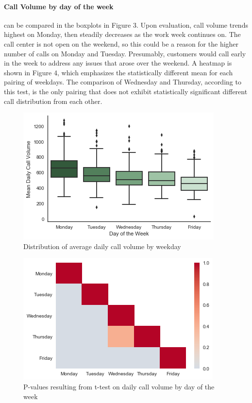 \documentclass[12pt]{article}
\begin{document}
\paragraph{Call Volume by day of the week} can be compared in the boxplots in Figure 3.  Upon evaluation, call volume trends highest on Monday, then steadily decreases as the work week continues on.  The call center is not open on the weekend, so this could be a reason for the higher number of calls on Monday and Tuesday. Presumably, customers would call early in the week to address any issues that arose over the weekend.  A heatmap is shown in Figure 4, which emphasizes the statistically different mean for each pairing of weekdays.  The comparison of Wednesday and Thursday, according to this test, is the only pairing that does not exhibit statistically significant different call distribution from each other.

	\begin{figure}
	\includegraphics[scale=.4]{Daily_Call_Boxplot.png}
	\caption{Distribution of average daily call volume by weekday}
	\end{figure}

	\begin{figure}
	\includegraphics[scale=.4]{Daily_Heatmap.png}
	\caption{P-values resulting from t-test on daily call volume by day of the week}
	\end{figure}
\end{document}
